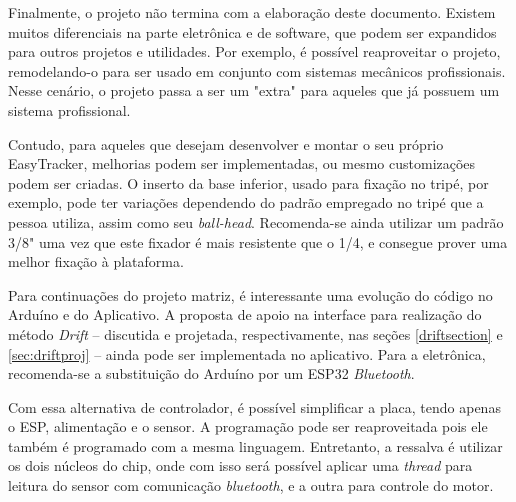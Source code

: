Finalmente, o projeto não termina com a elaboração deste documento. Existem muitos diferenciais na parte eletrônica e de software, que podem ser expandidos para outros projetos e utilidades. Por exemplo, é possível reaproveitar o projeto, remodelando-o para ser usado em conjunto com sistemas mecânicos profissionais. Nesse cenário, o projeto passa a ser um "extra" para aqueles que já possuem um sistema profissional. 

Contudo, para aqueles que desejam desenvolver e montar o seu próprio EasyTracker, melhorias podem ser implementadas, ou mesmo customizações podem ser criadas. O inserto da base inferior, usado para fixação no tripé, por exemplo, pode ter variações dependendo do padrão empregado no tripé que a pessoa utiliza, assim como seu \textit{ball-head}. Recomenda-se ainda utilizar um padrão 3/8" uma vez que este fixador é mais resistente que o 1/4, e consegue prover uma melhor fixação à plataforma.

Para continuações do projeto matriz, é interessante uma evolução do código no Arduíno e do Aplicativo. A proposta de apoio na interface para realização do método \textit{Drift} -- discutida e projetada, respectivamente, nas seções \ref{driftsection} e \ref{sec:driftproj} -- ainda pode ser implementada no aplicativo. Para a eletrônica, recomenda-se a substituição do Arduíno por um ESP32 \textit{Bluetooth}.

Com essa alternativa de controlador, é possível simplificar a placa, tendo apenas o ESP, alimentação e o sensor. A programação pode ser reaproveitada pois ele também é programado com a mesma linguagem. Entretanto, a ressalva é utilizar os dois núcleos do chip, onde com isso será possível aplicar uma \textit{thread} para leitura do sensor com comunicação \textit{bluetooth}, e a outra para controle do motor.